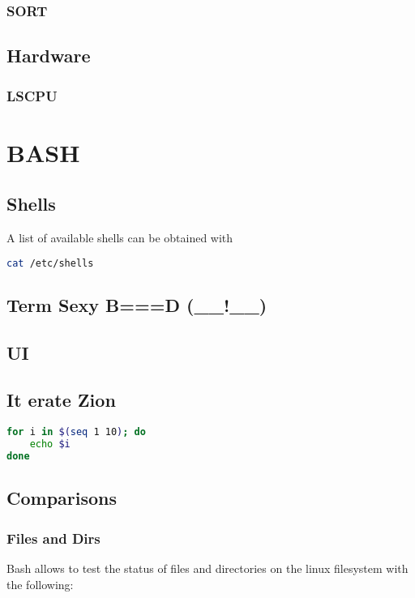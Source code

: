 \documentclass[12pt,a4paper]{article}
\begin{document}
\subsubsection{SORT}
\subsection{Hardware}
\subsubsection{LSCPU}

\section{BASH}
\subsection{Shells}
A list of available shells can be obtained with
\begin{lstlisting}[language=bash]
cat /etc/shells
\end{lstlisting}

\subsection{Term Sexy B===D (\_\_!\_\_)}
\subsection{UI}
\subsection{It erate Zion}
\begin{center}
\begin{lstlisting}[language=Bash]
for i in $(seq 1 10); do
	echo $i
done
\end{lstlisting}
\end{center} 


\subsection{Comparisons}

\subsubsection{Files and Dirs}
Bash allows to test the status of files and directories on the linux 
filesystem with the following:
\end{document}

